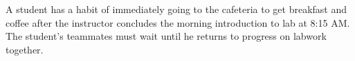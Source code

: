 \vskip 20pt

A student has a habit of immediately going to the cafeteria to get breakfast and coffee after the instructor concludes the morning introduction to lab at 8:15 AM.  The student's teammates must wait until he returns to progress on labwork together.





















